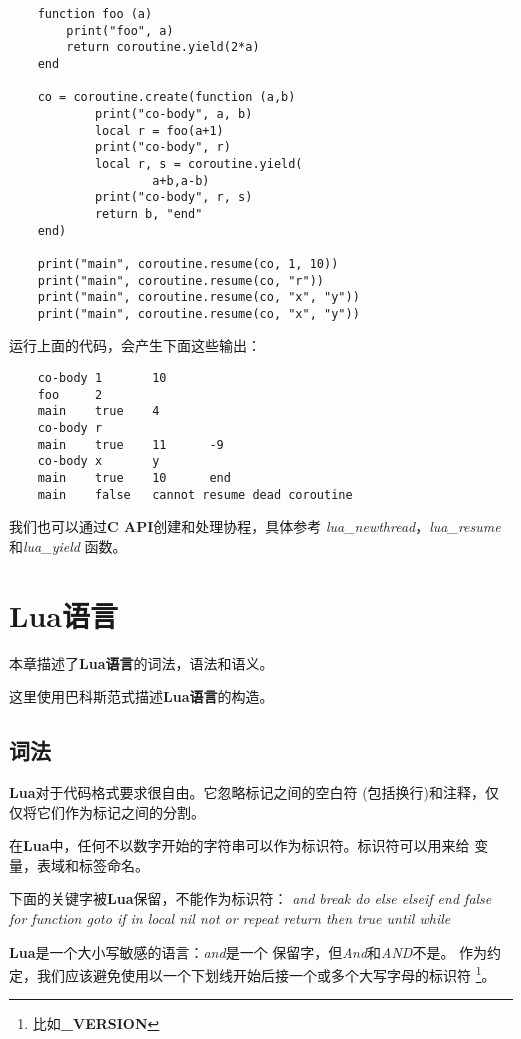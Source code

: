 \documentclass{ctexart}
\begin{document}
\lstset{language=C}
\begin{lstlisting}
	function foo (a)
		print("foo", a)
		return coroutine.yield(2*a)
	end

	co = coroutine.create(function (a,b)
			print("co-body", a, b)
			local r = foo(a+1)
			print("co-body", r)
			local r, s = coroutine.yield(
					a+b,a-b)
			print("co-body", r, s)
			return b, "end"
	end)
     
	print("main", coroutine.resume(co, 1, 10))
	print("main", coroutine.resume(co, "r"))
	print("main", coroutine.resume(co, "x", "y"))
	print("main", coroutine.resume(co, "x", "y"))
\end{lstlisting}

运行上面的代码，会产生下面这些输出：

\lstset{language=C}
\begin{lstlisting}
	co-body 1       10
	foo     2
	main    true    4
	co-body r
	main    true    11      -9
	co-body x       y
	main    true    10      end
	main    false   cannot resume dead coroutine
\end{lstlisting}

我们也可以通过\textbf{C API}创建和处理协程，具体参考
\emph{lua\_newthread}，\emph{lua\_resume}和\emph{lua\_yield}
函数。

\section{Lua语言}

本章描述了\textbf{Lua语言}的词法，语法和语义。

这里使用巴科斯范式描述\textbf{Lua语言}的构造。

\subsection{词法}

\textbf{Lua}对于代码格式要求很自由。它忽略标记之间的空白符
(包括换行)和注释，仅仅将它们作为标记之间的分割。

在\textbf{Lua}中，任何不以数字开始的字符串可以作为标识符。标识符可以用来给
变量，表域和标签命名。

下面的关键字被\textbf{Lua}保留，不能作为标识符：
\emph{
and		break	do			else		elseif		end
false	for		function	goto		if			in
local	nil		not			or			repeat		return
then	true	until		while
}

\textbf{Lua}是一个大小写敏感的语言：\emph{and}是一个
保留字，但\emph{And}和\emph{AND}不是。
作为约定，我们应该避免使用以一个下划线开始后接一个或多个大写字母的标识符
\footnote{比如\textbf{\_VERSION}}。
\end{document}
